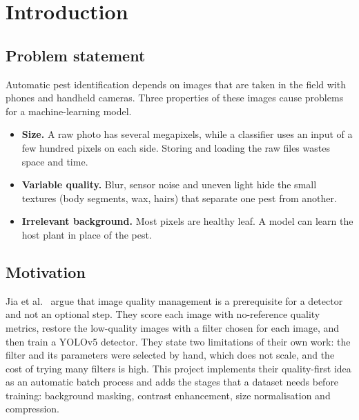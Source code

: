 \documentclass[12pt,a4paper]{article}
\let\oldsection\section
\renewcommand{\section}{\clearpage\oldsection}
\begin{document}
\clearpage
\begin{singlespace}
\tableofcontents
\clearpage
\listoffigures
\vspace{1cm}
\listoftables
\end{singlespace}

\section{Introduction}

\subsection{Problem statement}
Automatic pest identification depends on images that are taken in the field with phones and handheld cameras. Three properties of these images cause problems for a machine-learning model.
\begin{itemize}[nosep]
\item \textbf{Size.} A raw photo has several megapixels, while a classifier uses an input of a few hundred pixels on each side. Storing and loading the raw files wastes space and time.
\item \textbf{Variable quality.} Blur, sensor noise and uneven light hide the small textures (body segments, wax, hairs) that separate one pest from another.
\item \textbf{Irrelevant background.} Most pixels are healthy leaf. A model can learn the host plant in place of the pest.
\end{itemize}

\subsection{Motivation}
Jia et al.\ \cite{jia2025} argue that image quality management is a prerequisite for a detector and not an optional step. They score each image with no-reference quality metrics, restore the low-quality images with a filter chosen for each image, and then train a YOLOv5 detector. They state two limitations of their own work: the filter and its parameters were selected by hand, which does not scale, and the cost of trying many filters is high. This project implements their quality-first idea as an automatic batch process and adds the stages that a dataset needs before training: background masking, contrast enhancement, size normalisation and compression.
\end{document}
